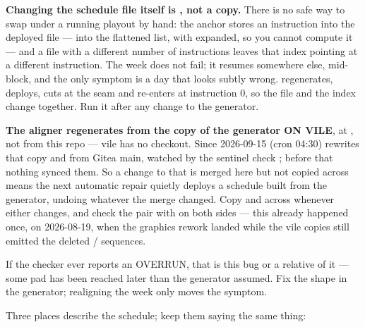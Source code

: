 \documentclass[fontpath=fonts/,logopath=logo/]{riposte-doc}
\begin{document}
\textbf{Changing the schedule file itself is , not a copy.} There is no safe way to swap  under a running playout by hand: the anchor stores an instruction  into the deployed file — into the flattened list, with  expanded, so you cannot compute it — and a file with a different number of instructions leaves that index pointing at a different instruction. The week does not fail; it resumes somewhere else, mid-block, and the only symptom is a day that looks subtly wrong.  regenerates, deploys, cuts at the seam and re-enters at instruction 0, so the file and the index change together. Run it after any change to the generator.

\textbf{The aligner regenerates from the copy of the generator ON VILE}, at , not from this repo — vile has no checkout. Since 2026-09-15  (cron 04:30) rewrites that copy and  from Gitea main, watched by the sentinel check ; before that nothing synced them. So a change to  that is merged here but not copied across means the next automatic repair quietly deploys a schedule built from the  generator, undoing whatever the merge changed. Copy  and  across whenever either changes, and check the pair with  on both sides — this already happened once, on 2026-08-19, when the graphics rework landed while the vile copies still emitted the deleted  /  sequences.

If the checker ever reports an OVERRUN, that is this bug or a relative of it — some pad has been reached later than the generator assumed. Fix the shape in the generator; realigning the week only moves the symptom.



Three places describe the schedule; keep them saying the same thing:
\end{document}
